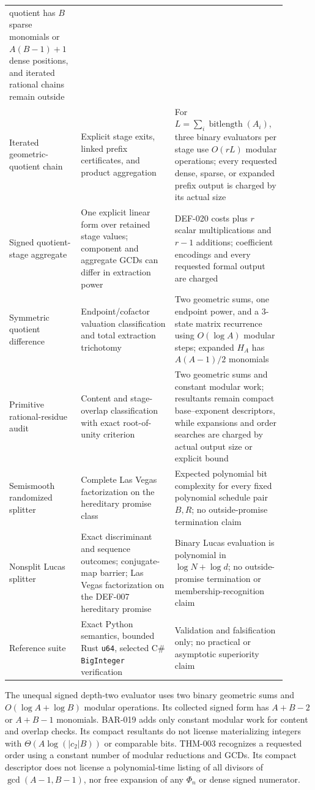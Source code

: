 \documentclass[11pt]{article}
\begin{document}
\begin{center}
\begin{tabular}{L{0.23\linewidth}L{0.31\linewidth}L{0.36\linewidth}}
quotient has \(B\) sparse monomials or \(A(B-1)+1\) dense positions, and
iterated rational chains remain outside \\
\addlinespace
Iterated geometric-quotient chain &
Explicit stage exits, linked prefix certificates, and product aggregation &
For \(L=\sum_i\operatorname{bitlength}(A_i)\), three binary evaluators per
stage use \(O(rL)\) modular operations; every requested dense, sparse, or
expanded prefix output is charged by its actual size \\
\addlinespace
Signed quotient-stage aggregate &
One explicit linear form over retained stage values; component and aggregate
GCDs can differ in extraction power &
DEF-020 costs plus \(r\) scalar multiplications and \(r-1\) additions;
coefficient encodings and every requested formal output are charged \\
\addlinespace
Symmetric quotient difference &
Endpoint/cofactor valuation classification and total extraction trichotomy &
Two geometric sums, one endpoint power, and a \(3\)-state matrix recurrence
using \(O(\log A)\) modular steps; expanded \(H_A\) has \(A(A-1)/2\)
monomials \\
\addlinespace
Primitive rational-residue audit &
Content and stage-overlap classification with exact root-of-unity criterion &
Two geometric sums and constant modular work; resultants remain compact
base--exponent descriptors, while expansions and order searches are charged
by actual output size or explicit bound \\
\addlinespace
Semismooth randomized splitter &
Complete Las Vegas factorization on the hereditary promise class &
Expected polynomial bit complexity for every fixed polynomial schedule pair
\(B,R\); no outside-promise termination claim \\
\addlinespace
Nonsplit Lucas splitter &
Exact discriminant and sequence outcomes; conjugate-map barrier; Las Vegas
factorization on the DEF-007 hereditary promise &
Binary Lucas evaluation is polynomial in \(\log N+\log d\); no
outside-promise termination or membership-recognition claim \\
\addlinespace
Reference suite &
Exact Python semantics, bounded Rust \texttt{u64}, selected C\#
\texttt{BigInteger} verification &
Validation and falsification only; no practical or asymptotic superiority
claim \\
\bottomrule
\end{tabular}
\end{center}

The unequal signed depth-two evaluator uses two binary geometric sums and
\(O(\log A+\log B)\) modular operations. Its collected signed form has
\(A+B-2\) or \(A+B-1\) monomials. BAR-019 adds only constant modular work
for content and overlap checks. Its compact resultants do not license
materializing integers with \(\Theta(A\log(|c_2|B))\) or comparable bits.
THM-003 recognizes a requested order using a constant number of modular
reductions and GCDs. Its compact descriptor does not license a polynomial-time
listing of all divisors of \(\gcd(A-1,B-1)\), nor free expansion of any
\(\Phi_n\) or dense signed numerator.
\end{document}
